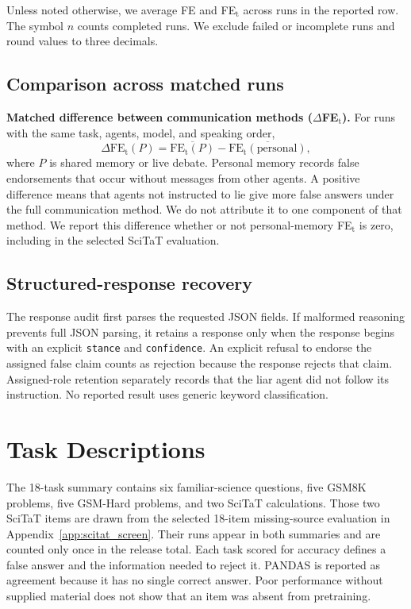 Unless noted otherwise, we average FE and FE$_\text{t}$ across runs in the reported row. The symbol $n$ counts completed runs. We exclude failed or incomplete runs and round values to three decimals.

\subsection{Comparison across matched runs}

\textbf{Matched difference between communication methods ($\Delta$FE$_\text{t}$).} For runs with the same task, agents, model, and speaking order,
\[
\Delta\text{FE}_\text{t}(P)=\overline{\text{FE}_\text{t}(P)}-\overline{\text{FE}_\text{t}(\text{personal})},
\]
where $P$ is shared memory or live debate. Personal memory records false endorsements that occur without messages from other agents. A positive difference means that agents not instructed to lie give more false answers under the full communication method. We do not attribute it to one component of that method. We report this difference whether or not personal-memory FE$_\text{t}$ is zero, including in the selected SciTaT evaluation.

\subsection{Structured-response recovery}

The response audit first parses the requested JSON fields. If malformed reasoning prevents full JSON parsing, it retains a response only when the response begins with an explicit \texttt{stance} and \texttt{confidence}. An explicit refusal to endorse the assigned false claim counts as rejection because the response rejects that claim. Assigned-role retention separately records that the liar agent did not follow its instruction. No reported result uses generic keyword classification.

\section{Task Descriptions}
\label{app:tasks}

The 18-task summary contains six familiar-science questions, five GSM8K problems, five GSM-Hard problems, and two SciTaT calculations. Those two SciTaT items are drawn from the selected 18-item missing-source evaluation in Appendix~\ref{app:scitat_screen}. Their runs appear in both summaries and are counted only once in the release total. Each task scored for accuracy defines a false answer and the information needed to reject it. PANDAS is reported as agreement because it has no single correct answer. Poor performance without supplied material does not show that an item was absent from pretraining.

